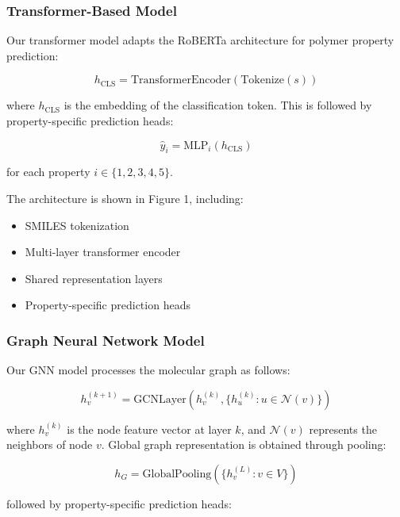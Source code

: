 \documentclass[10pt,twocolumn,letterpaper]{article}
\begin{document}
\subsubsection{Transformer-Based Model}

Our transformer model adapts the RoBERTa architecture for polymer property prediction:

\begin{equation}
h_{\text{CLS}} = \text{TransformerEncoder}(\text{Tokenize}(s))
\end{equation}

where $h_{\text{CLS}}$ is the embedding of the classification token. This is followed by property-specific prediction heads:

\begin{equation}
\hat{y}_i = \text{MLP}_i(h_{\text{CLS}})
\end{equation}

for each property $i \in \{1, 2, 3, 4, 5\}$.

The architecture is shown in Figure 1, including:
\begin{itemize}
    \item SMILES tokenization
    \item Multi-layer transformer encoder
    \item Shared representation layers
    \item Property-specific prediction heads
\end{itemize}

\subsubsection{Graph Neural Network Model}

Our GNN model processes the molecular graph as follows:

\begin{equation}
h_v^{(k+1)} = \text{GCNLayer}(h_v^{(k)}, \{h_u^{(k)}: u \in \mathcal{N}(v)\})
\end{equation}

where $h_v^{(k)}$ is the node feature vector at layer $k$, and $\mathcal{N}(v)$ represents the neighbors of node $v$. Global graph representation is obtained through pooling:

\begin{equation}
h_G = \text{GlobalPooling}(\{h_v^{(L)}: v \in V\})
\end{equation}

followed by property-specific prediction heads:
\end{document}

